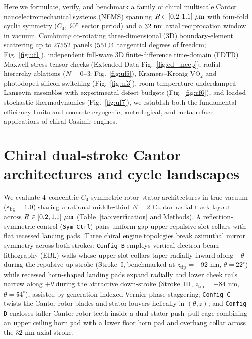 \documentclass[11pt,a4paper]{article}
\begin{document}
Here we formulate, verify, and benchmark a family of chiral multiscale Cantor nanoelectromechanical systems (NEMS) spanning $R \in [\EngineRMinUm{}, \EngineRMaxUm{}]\ \mu\text{m}$ with four-fold cyclic symmetry ($C_4$, $90{}^\circ$ sector period) and a $32{}\text{ nm}$ axial reciprocation window in vacuum. Combining co-rotating three-dimensional (3D) boundary-element scattering\cite{reid2013} up to $27552{}$ panels ($55104{}$ tangential degrees of freedom; Fig.~\ref{fig:uf1}), independent full-wave 3D finite-difference time-domain (FDTD) Maxwell stress-tensor checks\cite{rodriguez2009fdtd,oskooi2010meep} (Extended Data Fig.~\ref{fig:ed_meep}), radial hierarchy ablations ($N=0\text{--}3$; Fig.~\ref{fig:uf5}), Kramers--Kronig $\mathrm{VO}_2$ and photodoped-silicon switching (Fig.~\ref{fig:uf3}), room-temperature underdamped Langevin ensembles with experimental defect budgets (Fig.~\ref{fig:uf6}), and loaded stochastic thermodynamics\cite{seifert2012,barato2015tur} (Fig.~\ref{fig:uf7}), we establish both the fundamental efficiency limits and concrete cryogenic, metrological, and metasurface applications of chiral Casimir engines.

\section*{Chiral dual-stroke Cantor architectures and cycle landscapes}

We evaluate $4{}$ concentric $C_4$-symmetric rotor--stator architectures in true vacuum ($\varepsilon_{\mathrm{bg}}=1.0$) sharing a rational middle-third $N=2$ Cantor radial track layout across $R \in [\EngineRMinUm{}, \EngineRMaxUm{}]\ \mu\text{m}$ (Table~\ref{tab:verification} and Methods). A reflection-symmetric control (\texttt{Sym Ctrl}) pairs uniform-gap upper repulsive slot collars with flat recessed landing pads. Three chiral engine topologies break azimuthal mirror symmetry across both strokes: \texttt{Config B} employs vertical electron-beam-lithography (EBL) walls whose upper slot collars taper radially inward along $+\theta$ during the repulsive up-stroke (Stroke~I, benchmarked at $z_{\mathrm{tip}}=-92\text{ nm}$, $\theta=22^\circ$) while recessed horn-shaped landing pads expand radially and lower cheek rails narrow along $+\theta$ during the attractive down-stroke (Stroke~III, $z_{\mathrm{tip}}=-84\text{ nm}$, $\theta=64^\circ$), assisted by generation-indexed Vernier phase staggering; \texttt{Config C} twists the Cantor rotor blades and stator louvers helically in $(\theta,z)$; and \texttt{Config D} encloses taller Cantor rotor teeth inside a dual-stator push--pull cage combining an upper ceiling horn pad with a lower floor horn pad and overhang collar across the $32{}\text{ nm}$ axial stroke.
\end{document}
